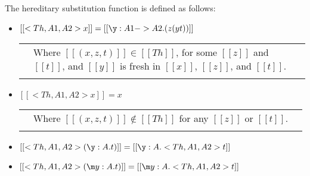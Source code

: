\begin{definition}
  \label{def:hereditary_substitution_function}
  The hereditary substitution function is defined as follows:
  \begin{itemize}
  \item[] $[[<Th,A1,A2>x]] = [[\y:A1 -> A2.(z (y t))]]$\\
    \begin{tabular}{lll}
      & Where $[[(x,z,t)]] \in [[Th]]$, for some $[[z]]$ and $[[t]]$, and $[[y]]$ is fresh in $[[x]]$, $[[z]]$, and $[[t]]$.\\
      & \\
    \end{tabular}
  \item[] $[[<Th,A1,A2>x]] = x$\\
    \begin{tabular}{lll}
      & Where $[[(x,z,t)]] \not\in [[Th]]$ for any $[[z]]$ or $[[t]]$.\\
      & \\
    \end{tabular}
  \item[] $[[<Th,A1,A2>(\y:A.t)]] = [[\y:A.<Th, A1, A2>t]]$
  \item[] $[[<Th,A1,A2>(\m y:A.t)]] = [[\m y:A.<Th, A1, A2>t]]$


\end{itemize}
\end{definition}
